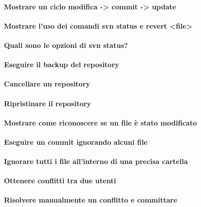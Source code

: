 \documentclass[a4paper]{article}
\begin{document}
	\paragraph{Mostrare un ciclo modifica -> commit -> update}
	
	\paragraph{Mostrare l'uso dei comandi svn status e revert <file>}
	
	\paragraph{Quali sono le opzioni di svn status?}
	
	\paragraph{Eseguire il backup del repository}
	
	\paragraph{Cancellare un repository}
	
	\paragraph{Ripristinare il repository}
	
	\paragraph{Mostrare come riconoscere se un file è stato modificato}
	
	\paragraph{Eseguire un commit ignorando alcuni file}
	
	\paragraph{Ignorare tutti i file all'interno di una precisa cartella}
	
	\paragraph{Ottenere conflitti tra due utenti}
	
	\paragraph{Risolvere manualmente un conflitto e committare}
	
\end{document}
